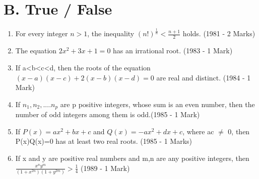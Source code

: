 \documentclass[journal,12pt,twocolumn]{IEEEtran}
\theoremstyle{remark}
\begin{document}
\section*{B. True / False}
\begin{enumerate}
    \item For every integer $n>1$, the inequality $(n!)^\frac{1}{n} < \frac{n+1}{2}$ holds. \hfill (1981 - 2 Marks)
    \item The equation $2x^2 + 3x + 1 = 0$ has an irrational root. \hfill (1983 - 1 Mark)
    \item If a<b<c<d, then the roots of the equation $(x-a)(x-c)+2(x-b)(x-d)=0$ are real and distinct. \hfill (1984 - 1 Mark)
    \item If $n_1, n_2, ....n_p$ are p positive integers, whose sum is an even number, then the number of odd integers among them is odd.\hfill (1985 - 1 Mark)
    \item If $P(x) = ax^2+bx+c$ and $Q(x)= -ax^2+dx+c$, where ac $\neq$ 0, then P(x)Q(x)=0 has at least two real roots. \hfill(1985 - 1 Marks)
    \item If x and y are positive real numbers and m,n are any positive integers, then $\frac{x^ny^m}{(1+ x^{2n})(1+ y^{2m})} > \frac{1}{4}$ \hfill (1989 - 1 Mark)
\end{enumerate}
\renewcommand{\thefigure}{\theenumi}
\renewcommand{\thetable}{\theenumi}
\end{document}
